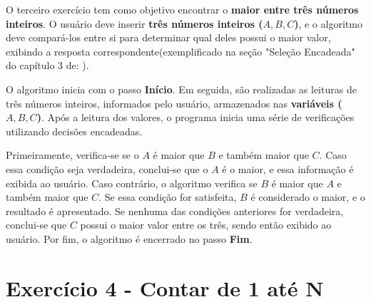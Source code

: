 \documentclass[12pt, a4paper]{article}
\begin{document}
O terceiro exercício tem como objetivo encontrar o \textbf{maior entre três números inteiros}. O usuário deve inserir \textbf{três números inteiros ($A, B, C$)}, e o algoritmo deve compará-los entre si para determinar qual deles possui o maior valor, exibindo a resposta correspondente(exemplificado na seção "Seleção Encadeada" do capítulo 3 de:
\cite{forbellone2005}). 

O algoritmo inicia com o passo \textbf{Início}. Em seguida, são realizadas as leituras de três números inteiros, informados pelo usuário, armazenados nas \textbf{variáveis ($A, B, C$)}.
Após a leitura dos valores, o programa inicia uma série de verificações utilizando decisões encadeadas. 

Primeiramente, verifica-se se o $A$ é maior que $B$ e também maior que $C$. 
Caso essa condição seja verdadeira, conclui-se que o $A$ é o maior, e essa informação é exibida ao usuário. Caso contrário, o algoritmo verifica se $B$ é maior que $A$ e também maior que $C$. Se essa condição for satisfeita, $B$ é considerado o maior, e o resultado é apresentado. Se nenhuma das condições anteriores for verdadeira, conclui-se que $C$ possui o maior valor entre os três, sendo então exibido ao usuário.
Por fim, o algoritmo é encerrado no passo \textbf{Fim}.

\section*{Exercício 4 - Contar de 1 até N}

\begin{center}
\end{center}
\end{document}
